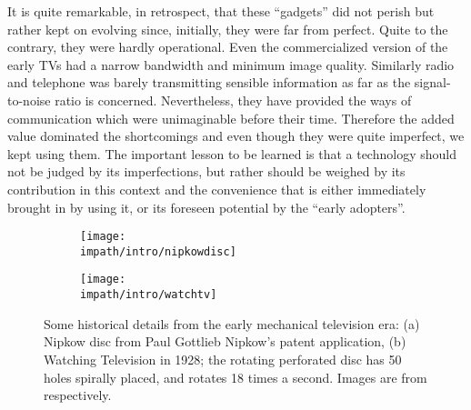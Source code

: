 It is quite remarkable, in retrospect, that these \enquote{gadgets} did not perish but rather kept on evolving since, initially, they were 
far from perfect. Quite to the contrary, they were hardly operational. Even the commercialized version of the early TVs had a narrow 
bandwidth and minimum image quality. Similarly radio and telephone was barely transmitting sensible information as far as the 
signal-to-noise ratio is concerned. Nevertheless, they have provided the ways of communication which were unimaginable before their time. Therefore 
the added value dominated the shortcomings and even though they were quite imperfect, we kept using them. The important lesson to be 
learned is that a technology should not be judged by its imperfections, but rather should be weighed by its contribution in this context 
and the convenience that is either immediately brought in by using it, or its foreseen potential by the \enquote{early adopters}. 
\begin{figure}
\begin{subfigure}[b]{.3\linewidth}
\centering%
\texttt{[image: \\impath/intro/nipkowdisc]}%
\caption{}
\label{fig:intro:nipkow}
\end{subfigure}%
\begin{subfigure}[b]{.65\linewidth}
\centering%
\texttt{[image: \\impath/intro/watchtv]}%
\caption{}
\label{fig:intro:watchtv}
\end{subfigure}
\caption[Some historical details from the early mechanical television era]%
{Some historical details from the early mechanical television era: (a) Nipkow disc from Paul Gottlieb Nipkow's patent application, 
(b) Watching Television in 1928; the rotating perforated disc has 50 holes spirally placed, and rotates 18 times a second. Images are 
from \cite{nipkow,watchtv} respectively.%
}
\label{fig:intro:mechtv}
\end{figure}


